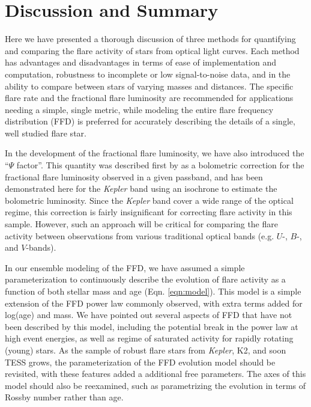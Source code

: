 \documentclass[preprint2]{aastex62}
\newcommand{\Kepler}{\textsl{Kepler}\xspace}
\begin{document}
\section{Discussion and Summary}
\label{sec:discussion}

Here we have presented a thorough discussion of three methods for quantifying and comparing the flare activity of stars from optical light curves. Each method has advantages and disadvantages in terms of ease of implementation and computation, robustness to incomplete or low signal-to-noise data, and in the ability to compare between stars of varying masses and distances. The specific flare rate and the fractional flare luminosity are recommended for applications needing a simple, single metric, while modeling the entire flare frequency distribution (FFD) is preferred for accurately describing the details of a single, well studied flare star.

In the development of the fractional flare luminosity, we have also introduced the ``$\Psi$ factor''. This quantity was described first by \citet{lurie2015} as a bolometric correction for the fractional flare luminosity observed in a given passband, and has been demonstrated here for the \Kepler band using an isochrone to estimate the bolometric luminosity. Since the \Kepler band cover a wide range of the optical regime, this correction is fairly insignificant for correcting flare activity in this sample. However, such an approach will be critical for comparing the flare activity between observations from various traditional optical bands (e.g. $U$-, $B$-, and $V$-bands).

In our ensemble modeling of the FFD, we have assumed a simple parameterization to continuously describe the evolution of flare activity as a function of both stellar mass and age (Eqn. \ref{eqn:model}). This model is a simple extension of the FFD power law commonly observed, with extra terms added for log(age) and mass. We have pointed out several aspects of FFD that have not been described by this model, including the potential break in the power law at high event energies, as well as regime of saturated activity for rapidly rotating (young) stars. As the sample of robust flare stars from \Kepler, K2, and soon TESS grows, the parameterization of the FFD evolution model should be revisited, with these features added a additional free parameters. The axes of this model should also be reexamined, such as parametrizing the evolution in terms of Rossby number rather than age.
\end{document}

